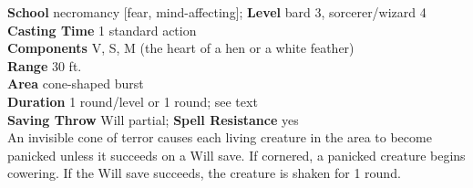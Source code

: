 \textbf{School} necromancy [fear, mind-affecting]; \textbf{Level} bard 3, sorcerer/wizard 4\\
\textbf{Casting Time} 1 standard action\\
\textbf{Components} V, S, M (the heart of a hen or a white feather)\\
\textbf{Range} 30 ft.\\
\textbf{Area} cone-shaped burst\\
\textbf{Duration} 1 round/level or 1 round; see text\\
\textbf{Saving Throw }Will partial; \textbf{Spell Resistance} yes\\
An invisible cone of terror causes each living creature in the area to become panicked unless it succeeds on a Will save. If cornered, a panicked creature begins cowering. If the Will save succeeds, the creature is shaken for 1 round.\\
